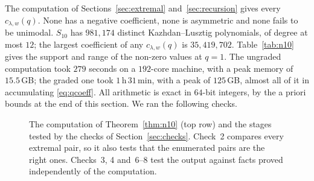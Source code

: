 \documentclass[11pt]{amsart}
\theoremstyle{definition}
\theoremstyle{remark}
\begin{document}
The computation of Sections~\ref{sec:extremal} and~\ref{sec:recursion} gives every $c_{\lambda,w}(q)$. None has a negative coefficient, none is asymmetric and none fails to be unimodal. $S_{10}$ has $981{,}174$ distinct Kazhdan--Lusztig polynomials, of degree at most $12$; the largest coefficient of any $c_{\lambda,w}(q)$ is $35{,}419{,}702$. Table~\ref{tab:n10} gives the support and range of the non-zero values at $q=1$. The ungraded computation took $279$ seconds on a $192$-core machine, with a peak memory of $15.5$\,GB; the graded one took $1$\,h\,$31$\,min, with a peak of $125$\,GB, almost all of it in accumulating \eqref{eq:qcoeff}. All arithmetic is exact in $64$-bit integers, by the a priori bounds at the end of this section. We ran the following checks.
\begin{figure}[t]
\centering
{}
\caption{The computation of Theorem~\ref{thm:n10} (top row) and the stages tested by the checks of Section~\ref{sec:checks}. Check~2 compares every extremal pair, so it also tests that the enumerated pairs are the right ones. Checks~3, 4 and~6--8 test the output against facts proved independently of the computation.}\label{fig:pipeline}
\end{figure}
\end{document}
